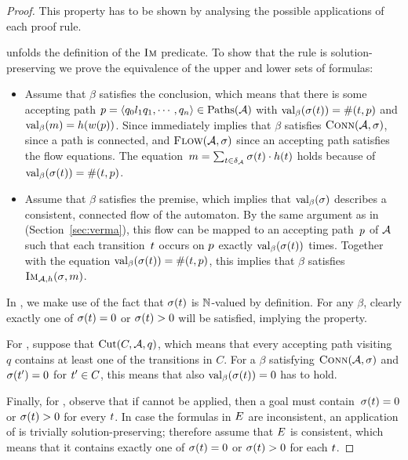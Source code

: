 \documentclass[acmsmall,review,anonymous,screen]{acmart}\settopmatter{printfolios=true,printccs=true,printacmref=true}
\theoremstyle{definition}
\begin{document}
\begin{proof}
  This property has to be shown by analysing the possible applications
  of each proof rule.

  \Expand{} unfolds the definition of the $\operatorname{\textsc{Im}}$ predicate. To show
  that the rule is solution-preserving we prove the equivalence of the
  upper and lower sets of formulas:
  \begin{itemize}
  \item Assume that $\beta$ satisfies the conclusion, which means that
    there is some accepting path
    $p = \left\langle q_0 l_1 q_1 , \cdots , q_n\right\rangle \in \operatorname{Paths}(\mathcal{A})$ with
    $\operatorname{val}_\beta(\operatorname{\sigma}(t)) = \operatorname{\#}(t,
    p)$ and $\operatorname{val}_\beta(m) =
    h(w(p))$. Since immediately implies that $\beta$
    satisfies $\operatorname{\textsc{Conn}}(\mathcal{A}, \operatorname{\sigma})$, since a path is
    connected, and $\textsc{Flow}(\mathcal{A}, \operatorname{\sigma})$ since an accepting
    path satisfies the flow equations. The
    equation~$m = \sum_{t \in
      \delta_{\mathcal{A}}}\operatorname{\sigma}(t) \cdot
    h(t)$ holds because of
    $\operatorname{val}_\beta(\operatorname{\sigma}(t)) = \operatorname{\#}(t,
    p)$.
  \item Assume that $\beta$ satisfies the premise, which implies that
    $\operatorname{val}_\beta(\operatorname{\sigma})$ describes a consistent, connected flow of
    the automaton. By the same argument as in
    \cite{generate-parikh-image} (Section~\ref{sec:verma}), this flow
    can be mapped to an accepting path~$p$ of $\mathcal{A}$ such
    that each transition~$t$ occurs on $p$ exactly
    $\operatorname{val}_\beta(\operatorname{\sigma}(t))$ times. Together with the equation
    $\operatorname{val}_\beta(\operatorname{\sigma}(t)) = \operatorname{\#}(t,
    p)$, this implies that $\beta$ satisfies $\operatorname{\textsc{Im}}_{\mathcal{A}, h}(\operatorname{\sigma}, m)$.
  \end{itemize}

  In \Split{}, we make use of the fact that $\operatorname{\sigma}(t)$ is
  $\mathbb{N}$-valued by definition. For any $\beta$, clearly exactly
  one of $\operatorname{\sigma}(t) = 0$ or $\operatorname{\sigma}(t) > 0$ will
  be satisfied, implying the property.

  For \Propagate{}, suppose that
  $\operatorname{Cut}(C, \mathcal{A}, q)$, which means that every
  accepting path visiting~$q$ contains at least one of the transitions
  in $C$. For a $\beta$ satisfying $\operatorname{\textsc{Conn}}(\mathcal{A}, \operatorname{\sigma})$
  and $\operatorname{\sigma}(t') = 0$ for $t' \in C$, this means
  that also $\operatorname{val}_\beta(\operatorname{\sigma}(t)) = 0$ has to hold.

  Finally, for \Subsume{}, observe that if \Split{} cannot be applied,
  then a goal must contain~$\operatorname{\sigma}(t) = 0$ or
  $\operatorname{\sigma}(t) > 0$ for every $t$. In case the
  formulas in $E$ are inconsistent, an application of
  \Subsume{} is trivially solution-preserving; therefore assume that
  $E$ is consistent, which means that it contains
  exactly one of $\operatorname{\sigma}(t) = 0$ or
  $\operatorname{\sigma}(t) > 0$ for each $t$.
\end{proof}
\end{document}

